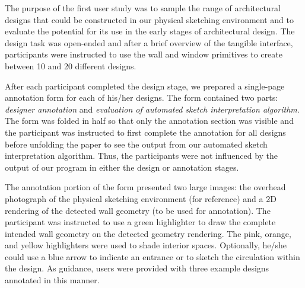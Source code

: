 The purpose of the first user study was to sample the range of
architectural designs that could be constructed in our physical
sketching environment and to evaluate the potential for its use in the
early stages of architectural design.  The design task was open-ended
and after a brief overview of the tangible interface, participants
were instructed to use the wall and window primitives to create
between 10 and 20 different designs.


After each participant completed the design stage, we prepared a
single-page annotation form for each of his/her designs.  The form
contained two parts: {\em designer annotation} and {\em evaluation of
  automated sketch interpretation algorithm}.  The form was folded in
half so that only the annotation section was visible and the
participant was instructed to first complete the annotation for all
designs before unfolding the paper to see the output from our
automated sketch interpretation algorithm.  Thus, the participants
were not influenced by the output of our program in either the design
or annotation stages.

%
%

The annotation portion of the form presented two large images: the
overhead photograph of the physical sketching environment (for
reference) and a 2D rendering of the detected wall geometry (to be
used for annotation).  The participant was instructed to use a green
highlighter to draw the complete intended wall geometry on the
detected geometry rendering. The pink, orange, and yellow highlighters
were used to shade interior spaces.  Optionally, he/she could use a
blue arrow to indicate an entrance or to sketch the circulation within
the design.  As guidance, users were provided with three example
designs annotated in this manner.

